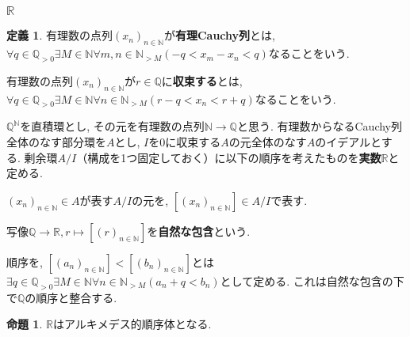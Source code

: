 \documentclass[a4paper, twoside]{bxjsarticle}
\newcommand{\nat}{\mathbb{N}}
\newcommand{\quo}{\mathbb{Q}}
\newcommand{\rea}{\mathbb{R}}
\theoremstyle{definition}
\newtheorem{prop}[thm]{命題}
\newtheorem{defn}[thm]{定義}
\begin{document}
    \subsubsection{$\rea$}
        \begin{defn}
            有理数の点列$(x_n)_{n\in\nat}$が\textbf{有理Cauchy列}とは, $\forall q\in\quo_{>0} \exists M\in\nat \forall m, n\in \nat_{>M} (-q<x_m-x_n<q)$なることをいう.
            
            有理数の点列$(x_n)_{n\in\nat}$が$r\in\quo$に\textbf{収束する}とは, $\forall q\in\quo_{>0} \exists M\in\nat \forall n\in\nat_{>M} (r-q<x_n<r+q)$なることをいう.

            $\quo^\nat$を直積環とし, その元を有理数の点列$\nat\to\quo$と思う. 有理数からなるCauchy列全体のなす部分環を$A$とし, $I$を0に収束する$A$の元全体のなす$A$のイデアルとする. 剰余環$A/I$（構成を1つ固定しておく）に以下の順序を考えたものを\textbf{実数}$\rea$と定める.
            
            $(x_n)_{n\in\nat}\in A$が表す$A/I$の元を, $[(x_n)_{n\in\nat}]\in A/I$で表す.
            
            写像$\quo\to\rea, r\mapsto[(r)_{n\in\nat}]$を\textbf{自然な包含}という.
        
            順序を, $[(a_n)_{n\in\nat}] < [(b_n)_{n\in\nat}]$とは$\exists q\in\quo_{>0}\exists M\in\nat \forall n\in\nat_{>M} (a_n+q<b_n)$として定める. これは自然な包含の下で$\quo$の順序と整合する.
       \end{defn}
        \begin{prop}
            $\rea$はアルキメデス的順序体となる. 
        \end{prop}
\end{document}
